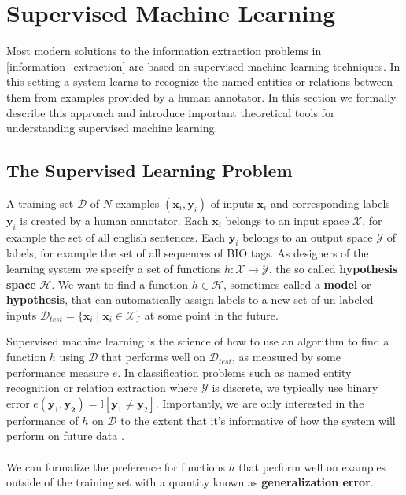 \section{Supervised Machine Learning}
\label{supervised_machine_learning}

Most modern solutions to the information extraction problems in \ref{information_extraction} are based on supervised machine learning techniques. In this setting a system learns to recognize the named entities or relations between them from examples provided by a human annotator. In this section we formally describe this approach and introduce important theoretical tools for understanding supervised machine learning.

\subsection{The Supervised Learning Problem}
\label{the_supervised_learning_problem}
A training set $\mathcal{D}$ of $N$ examples $(\mathbf{x}_i, \mathbf{y}_i)$ of inputs $\mathbf{x}_i$ and corresponding labels $\mathbf{y}_i$ is created by a human annotator. Each $\mathbf{x}_i$ belongs to an input space $\mathcal{X}$, for example the set of all english sentences. Each $\mathbf{y}_i$ belongs to an output space $\mathcal{Y}$ of labels, for example the set of all sequences of BIO tags. As designers of the learning system we specify a set of functions $h: \mathcal{X} \mapsto \mathcal{Y}$, the so called \textbf{hypothesis space} $\mathcal{H}$. We want to find a function $h \in \mathcal{H}$, sometimes called a \textbf{model} or \textbf{hypothesis}, that can automatically assign labels to a new set of un-labeled inputs $\mathcal{D}_{test} = \{ \mathbf{x}_i \mid \mathbf{x}_i \in \mathcal{X}\}$ at some point in the future. 

Supervised machine learning is the science of how to use an algorithm to find a function $h$ using $\mathcal{D}$ that performs well on $\mathcal{D}_{test}$, as measured by some performance measure $e$. In classification problems such as named entity recognition or relation extraction where $\mathcal{Y}$ is discrete, we typically use binary error $e(\mathbf{y}_1, \mathbf{y_2}) = \mathbb{I}[\mathbf{y}_1 \neq \mathbf{y}_2]$. Importantly, we are only interested in the performance of $h$ on $\mathcal{D}$ to the extent that it's informative of how the system will perform on future data \citep{yaser12}.
\\\\
We can formalize the preference for functions $h$ that perform well on examples outside of the training set with a quantity known as \textbf{generalization error}.

